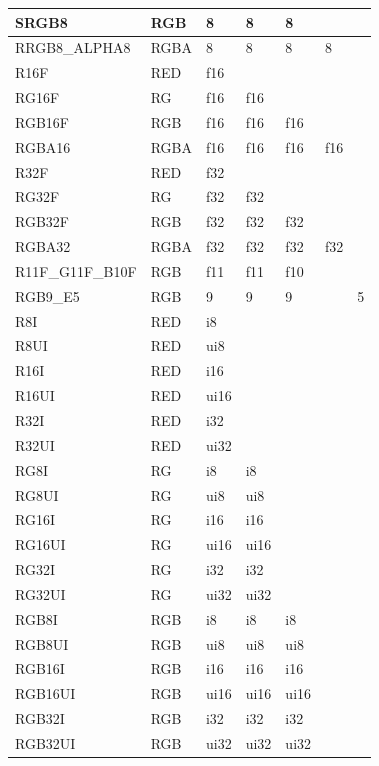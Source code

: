 \begin{longtable}{>{\small}p{}|>{\small}p{}|>{\small}p{}|>{\small}p{}|>{\small}p{}|>{\small}p{}|>{\small}p{}}
  SRGB8         & RGB  & 8 & 8 & 8 & &\\\hline
  RRGB8\_ALPHA8 & RGBA & 8 & 8 & 8 & 8 &\\\hline
  R16F          & RED  & f16 & & & &\\\hline
  RG16F         & RG   & f16 & f16 & & &\\\hline
  RGB16F        & RGB  & f16 & f16 & f16 & &\\\hline
  RGBA16        & RGBA & f16 & f16 & f16 & f16 &\\\hline
  
  R32F          & RED  & f32 & & & &\\\hline
  RG32F         & RG   & f32 & f32 & & &\\\hline
  RGB32F        & RGB  & f32 & f32 & f32 & &\\\hline
  RGBA32        & RGBA & f32 & f32 & f32 & f32 &\\\hline
  
  R11F\_G11F\_B10F  & RGB & f11 & f11 & f10 & &\\\hline
  RGB9\_E5          & RGB & 9   & 9   & 9 & & 5\\\hline
  
  R8I           & RED & i8 & & & &\\\hline
  R8UI          & RED & ui8 & & & &\\\hline
  R16I          & RED & i16 & & & &\\\hline
  R16UI         & RED & ui16 & & & &\\\hline
  R32I          & RED & i32 & & & &\\\hline
  R32UI         & RED & ui32 & & & &\\\hline
  
  RG8I          & RG & i8 & i8 & & &\\\hline
  RG8UI         & RG & ui8 & ui8 & & &\\\hline
  RG16I         & RG & i16 & i16& & &\\\hline
  RG16UI        & RG & ui16& ui16& & &\\\hline
  RG32I         & RG & i32 & i32 & & &\\\hline
  RG32UI        & RG &  ui32 & ui32& & &\\\hline
  
  RGB8I          & RGB & i8 & i8 & i8 & &\\\hline
  RGB8UI         & RGB & ui8 & ui8 & ui8 & &\\\hline
  RGB16I         & RGB & i16 & i16& i16& &\\\hline
  RGB16UI        & RGB & ui16& ui16& ui16& &\\\hline
  RGB32I         & RGB & i32 & i32 & i32& &\\\hline
  RGB32UI        & RGB & ui32 & ui32& ui32& &\\\hline
  

\end{longtable}
